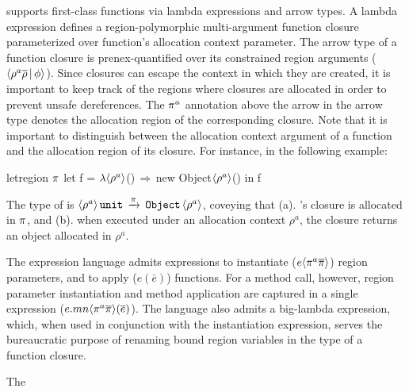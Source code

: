 \fbname supports first-class functions via lambda expressions and
arrow types. A lambda expression defines a region-polymorphic
multi-argument function closure parameterized over function's
allocation context parameter. The arrow type of a function closure is
prenex-quantified over its constrained region arguments
($\langle \rho^a\overline{\rho} \,|\, \phi \rangle$). Since closures can escape the
context in which they are created, it is important to keep track of
the regions where closures are allocated in order to prevent unsafe
dereferences. The $\pi^a$ annotation above the arrow in the arrow
type denotes the allocation region of the corresponding closure. Note
that it is important to distinguish between the allocation context
argument of a function and the allocation region of its closure. For
instance, in the following example:
\begin{codejava}
letregion $\pi$ {
  let f = $\lambda{\langle \rho^a \rangle}$()$\,\Rightarrow\,$new Object$\langle \rho^a \rangle$() 
  in f
}
\end{codejava}
The type of  is $\langle \rho^a \rangle\,{\tt unit}\, \xrightarrow{\pi}
\,{\tt Object}\,\langle \rho^a \rangle$, coveying that (a). 's closure is allocated
in $\pi$, and (b). when executed under an allocation context
$\rho^a$, the closure returns an object allocated in $\rho^a$.

The expression language admits expressions to instantiate
($e\langle \pi^a\overline{\pi} \rangle$) region parameters, and to apply
($e(\bar{e})$) functions. For a method call, however, region parameter
instantiation and method application are captured in a single
expression ($e.mn\langle \pi^a \overline{\pi} \rangle(\overline{e})$). The language also
admits a big-lambda expression, which, when used in conjunction with
the instantiation expression, serves the bureaucratic purpose of
renaming bound region variables in the type of a function closure. 

The 

